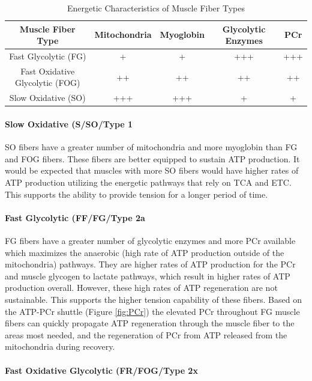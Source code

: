 \begin{table}[h!]
\centering
\begin{tabular}{||c c c c c||} 
 \hline
 Muscle Fiber Type & Mitochondria & Myoglobin & Glycolytic Enzymes & PCr \\ [0.5ex] 
 \hline\hline
 Fast Glycolytic (FG)  & + & + & +++ & +++ \\ 
 Fast Oxidative Glycolytic (FOG) & ++ & ++ & ++ & ++ \\
 Slow Oxidative (SO) &  +++ & +++ & + & + \\ [1ex] 
 \hline
\end{tabular}
\caption{Energetic Characteristics of Muscle Fiber Types}
\label{table:Muscle_Fiber_Energetics}
\end{table}

\paragraph{Slow Oxidative (S/SO/Type 1}

SO fibers have a greater number of mitochondria and more myoglobin than FG and FOG fibers. These fibers are better equipped to sustain ATP production. It would be expected that muscles with more SO fibers would have higher rates of ATP production utilizing the energetic pathways that rely on TCA and ETC. This supports the ability to provide tension for a longer period of time.

\paragraph{Fast Glycolytic (FF/FG/Type 2a}

FG fibers have a greater number of glycolytic enzymes and more PCr available which maximizes the anaerobic (high rate of ATP production outside of the mitochondria) pathways. They are higher rates of ATP production for the PCr and muscle glycogen to lactate pathways, which result in higher rates of ATP production overall. However, these high rates of ATP regeneration are not sustainable. This supports the higher tension capability of these fibers. Based on the ATP-PCr shuttle (Figure \ref{fig:PCr}) the elevated PCr throughout FG muscle fibers can quickly propagate ATP regeneration through the muscle fiber to the areas most needed, and the regeneration of PCr from ATP released from the mitochondria during recovery.

\paragraph{Fast Oxidative Glycolytic (FR/FOG/Type 2x}

